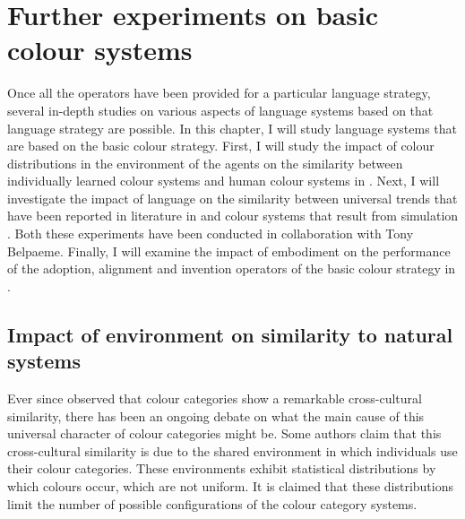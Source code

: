 \chapter{Further experiments on basic colour systems}
\label{s:basic-experiments}

Once all the operators have been provided for a particular language
strategy, several in-depth studies on various aspects of language
systems based on that language strategy are possible. In this chapter,
I will study language systems that are based on the basic colour
strategy. First, I will study the impact of colour distributions in
the environment of the agents on the similarity between individually
learned colour systems and human colour systems in  \citep{belpaeme09impact}. Next, I will
investigate the impact of language on the similarity between universal
trends that have been reported in literature in  and colour systems that result from
simulation \citep{belpaeme05eelc, belpaeme05explaining,
  belpaeme07language}. Both these experiments have been conducted in
collaboration with Tony Belpaeme. Finally, I will examine the impact
of embodiment on the performance of the adoption, alignment and
invention operators of the basic colour strategy in  \citep{bleys09grounded}.

\section{Impact of environment on similarity to natural systems}
\label{s:impact-of-environment}

Ever since \cite{berlin69basic} observed that colour categories show a
remarkable cross-cultural similarity, there has been an
ongoing debate on what the main cause of this universal character of
colour categories might be. Some authors
\citep{vanwijk59crosscultural, shepard92perceptual,
  yendrikhovskij01computational} claim that this cross-cultural
similarity is due to the shared environment in which individuals use
their colour categories. These environments exhibit statistical
distributions by which colours occur, which are not uniform. It is
claimed that these distributions limit the number of possible
configurations of the colour category systems.

